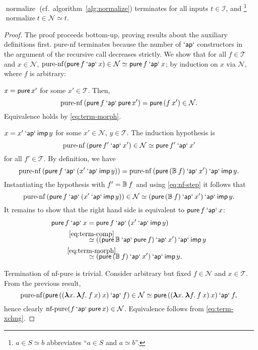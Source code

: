 \begin{lemma}\label{thm:normalize-alg}
$\operatorname{normalize}$ (cf.\ algorithm~\ref{alg:normalize}) terminates for all
inputs $t \in \mathcal{I}$, and%
\footnote{$a \in S \simeq b$ abbreviates ``$a \in S$ and $a \simeq b$''.}
$\operatorname{normalize} t \in \mathcal{N} \simeq t$.
\end{lemma}
\begin{proof}
The proof proceeds bottom-up, proving results about the auxiliary definitions
first.
pure-nf terminates because the number of $\mathbin{\mathsf{`ap`}}$ constructors in the argument
of the recursive call decreases strictly.
We show that for all $f \in \mathcal{T}$ and $x \in \mathcal{N}$,
$\operatorname{pure-nf}(\operatorname{\mathsf{pure}} f \mathbin{\mathsf{`ap`}} x) \in \mathcal{N} \simeq \operatorname{\mathsf{pure}} f \mathbin{\mathsf{`ap`}} x$;
by induction on $x$ via $\mathcal{N}$, where $f$ is arbitrary:
\begin{prfcases}
\item $x = \operatorname{\mathsf{pure}} x'$ for some $x' \in \mathcal{T}$. Then,
	\[ \operatorname{pure-nf}{(\operatorname{\mathsf{pure}} f \mathbin{\mathsf{`ap`}} \operatorname{\mathsf{pure}} x')} = \operatorname{\mathsf{pure}}{(f \> x')} \in \mathcal{N}. \]
	Equivalence holds by \eqref{eq:term-morph}.
\item $x = x' \mathbin{\mathsf{`ap`}} \operatorname{\mathsf{imp}} y$ for some $x' \in \mathcal{N}$, $y \in \mathcal{T}$.
	The induction hypothesis is
	\[ \operatorname{pure-nf}{(\operatorname{\mathsf{pure}} f' \mathbin{\mathsf{`ap`}} x')} \in \mathcal{N} \simeq \operatorname{\mathsf{pure}} f' \mathbin{\mathsf{`ap`}} x' \]
	for all $f' \in \mathcal{T}$.
	By definition, we have
	\[ \operatorname{pure-nf}{(\operatorname{\mathsf{pure}} f \mathbin{\mathsf{`ap`}} (x' \mathbin{\mathsf{`ap`}} \operatorname{\mathsf{imp}} y))} =
		\operatorname{pure-nf}{(\operatorname{\mathsf{pure}}{(\mathbb{B} \> f)} \mathbin{\mathsf{`ap`}} x')} \mathbin{\mathsf{`ap`}} \operatorname{\mathsf{imp}} y. \]
	Instantiating the hypothesis with $f' = \mathbb{B} \> f$ and using \eqref{eq:nf-step}
	it follows that
	\[ \operatorname{pure-nf}{(\operatorname{\mathsf{pure}} f \mathbin{\mathsf{`ap`}} (x' \mathbin{\mathsf{`ap`}} \operatorname{\mathsf{imp}} y))} \in \mathcal{N} \simeq
		(\operatorname{\mathsf{pure}}{(\mathbb{B} \> f)} \mathbin{\mathsf{`ap`}} x') \mathbin{\mathsf{`ap`}} \operatorname{\mathsf{imp}} y. \]
	It remains to show that the right hand side is equivalent to $\operatorname{\mathsf{pure}} f \mathbin{\mathsf{`ap`}} x$:
	\begin{align*}
		\spure f \sap x &= \spure f \sap (x' \sap \simp y) \\
		&\stackrel{\mathclap{\eqref{eq:term-comp}}}{\simeq} ((\spure \mathbb{B} \sap \spure f) \sap x') \sap \simp y \\
		&\stackrel{\mathclap{\eqref{eq:term-morph}}}{\simeq} (\spure{(\mathbb{B} \sapp f)} \sap x') \sap \simp y.
	\end{align*}
\end{prfcases}

Termination of nf-pure is trivial.
Consider arbitrary but fixed $f \in \mathcal{N}$ and $x \in \mathcal{T}$.
From the previous result,
\[ \operatorname{pure-nf}(\operatorname{\mathsf{pure}}{(({\boldsymbol\lambda} x.\>{\boldsymbol\lambda} f.\>f \> x) \> x)} \mathbin{\mathsf{`ap`}} f)
	\in \mathcal{N} \simeq \operatorname{\mathsf{pure}}{(({\boldsymbol\lambda} x.\>{\boldsymbol\lambda} f.\>f \> x) \> x)} \mathbin{\mathsf{`ap`}} f, \]
hence clearly $\operatorname{nf-pure}(f \mathbin{\mathsf{`ap`}} \operatorname{\mathsf{pure}} x) \in \mathcal{N}$.
Equivalence follows from \eqref{eq:term-xchng}.


\end{proof}
